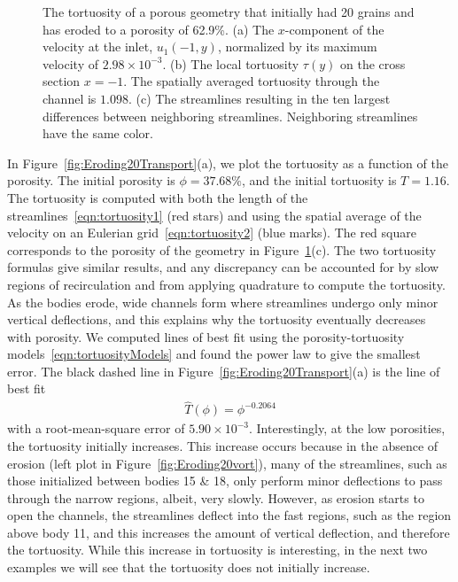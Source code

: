 \documentclass[preprint,10pt]{elsarticle}
\begin{document}
\begin{figure}[H]
\begin{subfigure}[b]{0.5\textwidth}
\caption{}
\end{subfigure}
\caption{\label{fig:Eroding20tort} The tortuosity of a porous geometry
that initially had 20 grains and has eroded to a porosity of 62.9\%.
(a) The $x$-component of the velocity at the inlet, $u_1(-1,y)$,
normalized by its maximum velocity of $2.98 \times 10^{-3}$. (b) The
local tortuosity $\tau(y)$ on the cross section $x = -1$.  The spatially
averaged tortuosity through the channel is $1.098$.  (c) The streamlines
resulting in the ten largest differences between neighboring
streamlines.  Neighboring streamlines have the same color.}
\end{figure}

In Figure~\ref{fig:Eroding20Transport}(a), we plot the tortuosity as a
function of the porosity. The initial porosity is $\phi = 37.68\%$, and
the initial tortuosity is $T = 1.16$.  The tortuosity is computed with
both the length of the streamlines~\eqref{eqn:tortuosity1} (red stars)
and using the spatial average of the velocity on an Eulerian
grid~\eqref{eqn:tortuosity2} (blue marks).  The red square corresponds
to the porosity of the geometry in Figure~\ref{fig:Eroding20tort}(c).
The two tortuosity formulas give similar results, and any discrepancy
can be accounted for by slow regions of recirculation and from applying
quadrature to compute the tortuosity.  As the bodies erode, wide
channels form where streamlines undergo only minor vertical deflections,
and this explains why the tortuosity eventually decreases with porosity.
We computed lines of best fit using the porosity-tortuosity
models~\eqref{eqn:tortuosityModels} and found the power law to give the
smallest error.  The  black dashed line in
Figure~\ref{fig:Eroding20Transport}(a) is the line of best fit
\begin{align}
  \widehat{T}(\phi) = \phi^{-0.2064}
\end{align}
with a root-mean-square error of $5.90 \times 10^{-3}$.  Interestingly,
at the low porosities, the tortuosity initially increases. This increase
occurs because in the absence of erosion (left plot in
Figure~\ref{fig:Eroding20vort}), many of the streamlines, such as those
initialized between bodies 15 \& 18, only perform minor deflections to
pass through the narrow regions, albeit, very slowly.  However, as
erosion starts to open the channels, the streamlines deflect into the
fast regions, such as the region above body 11, and this increases the
amount of vertical deflection, and therefore the tortuosity. While this
increase in tortuosity is interesting, in the next two examples we will
see that the tortuosity does not initially increase.
\end{document}
